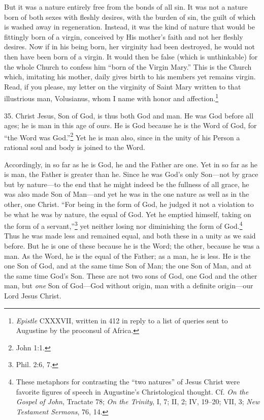 But it was a nature entirely free from the bonds of all sin. It was not a nature born of both sexes with fleshly desires, with the burden of sin, the guilt of which is washed away in regeneration. Instead, it was the kind of nature that would be fittingly born of a virgin, conceived by His mother's faith and not her fleshly desires. Now if in his being born, her virginity had been destroyed, he would not then have been born of a virgin. It would then be false (which is unthinkable) for the whole Church to confess him ``born of the Virgin Mary.'' This is the Church which, imitating his mother, daily gives birth to his members yet remains virgin. Read, if you please, my letter on the virginity of Saint Mary written to that illustrious man, Volusianus, whom I name with honor and affection.\footnote{\emph{Epistle} CXXXVII, written in 412 in reply to a list of queries sent to Augustine by the proconsul of Africa.}

35. Christ Jesus, Son of God, is thus both God and man. He was God before all ages; he is man in this age of ours. He is God because he is the Word of God, for ``the Word was God.''\footnote{John 1:1.} Yet he is man also, since in the unity of his Person a rational soul and body is joined to the Word.

Accordingly, in so far as he is God, he and the Father are one. Yet in so far as he is man, the Father is greater than he. Since he was God's only Son—not by grace but by nature—to the end that he might indeed be the fullness of all grace, he was also made Son of Man—and yet he was in the one nature as well as in the other, one Christ. ``For being in the form of God, he judged it not a violation to be what he was by nature, the equal of God. Yet he emptied himself, taking on the form of a servant,''\footnote{Phil. 2:6, 7.} yet neither losing nor diminishing the form of God.\footnote{These metaphors for contrasting the ``two natures'' of Jesus Christ were favorite figures of speech in Augustine's Christological thought. Cf. \emph{On the Gospel of John}, Tractate 78; \emph{On the Trinity}, I, 7; II, 2; IV, 19–20; VII, 3; \emph{New Testament Sermons}, 76, 14.} Thus he was made less and remained equal, and both these in a unity as we said before. But he is one of these because he is the Word; the other, because he was a man. As the Word, he is the equal of the Father; as a man, he is less. He is the one Son of God, and at the same time Son of Man; the one Son of Man, and at the same time God's Son. These are not two sons of God, one God and the other man, but \emph{one} Son of God—God without origin, man with a definite origin—our Lord Jesus Christ.

